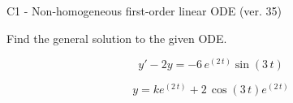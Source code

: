 \begin{exercise}
  \begin{exerciseTitle}C1 - Non-homogeneous first-order linear ODE (ver. 35)\end{exerciseTitle}
  \begin{exerciseStatement}
    
Find the general solution to the given ODE.

    
\[y'-2y= -6 \, e^{\left(2 \, t\right)} \sin\left(3 \, t\right)\]

  \end{exerciseStatement}
  \begin{exerciseAnswer}
    
\[y= k e^{\left(2 \, t\right)} + 2 \, \cos\left(3 \, t\right) e^{\left(2 \, t\right)}\]

  \end{exerciseAnswer}
\end{exercise}